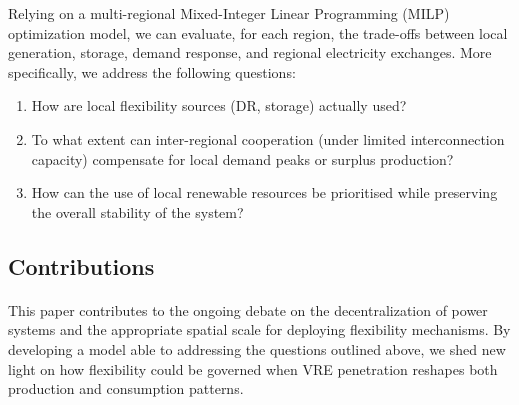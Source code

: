 \documentclass[12pt]{article}
\begin{document}
Relying on a multi-regional Mixed-Integer Linear Programming (MILP) optimization model, we can evaluate, for each region, the trade-offs between local generation, storage, demand response, and regional electricity exchanges. More specifically, we address the following questions:


\begin{enumerate}
  \item How are local flexibility sources (DR, storage) actually used?
  \item To what extent can inter-regional cooperation (under limited interconnection capacity) compensate for local demand peaks or surplus production?
  \item How can the use of local renewable resources be prioritised while preserving the overall stability of the system?
\end{enumerate}

\subsection{Contributions} 

\paragraph{} This paper contributes to the ongoing debate on the decentralization of power systems and the appropriate spatial scale for deploying flexibility mechanisms. By developing a model able to addressing the questions outlined above, we shed new light on how flexibility could be governed when VRE penetration reshapes both production and consumption patterns. 
\end{document}
